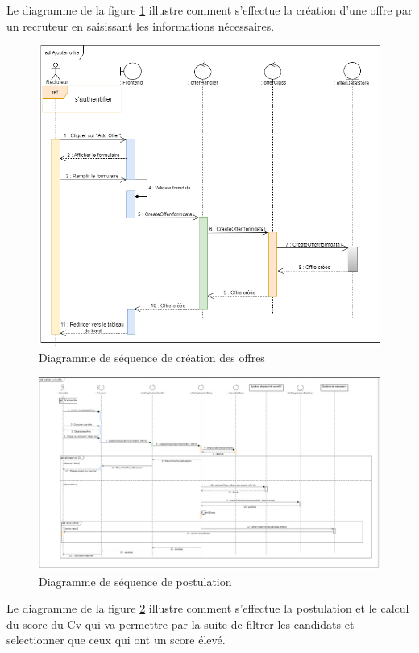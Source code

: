 Le diagramme de la figure \ref{fig:seq2} illustre comment s'effectue la création d'une offre par un recruteur en saisissant les informations nécessaires.
\\
\begin{figure}[H]
   \centering
   \includegraphics[scale=0.5]{diag/2.png} %
   \caption{Diagramme de séquence de création des offres}
   \label{fig:seq2}
\end{figure}

\begin{figure}
   \centering
   \includegraphics[scale=0.9]{diag/sd3.jpg} %
   \caption{Diagramme de séquence de postulation}
   \label{fig:seq3}
\end{figure}
Le diagramme de la figure \ref{fig:seq3} illustre comment s'effectue la postulation et le calcul du score du Cv qui va permettre par la suite de filtrer les candidats et selectionner que ceux qui ont un score élevé.
\vspace{7cm}

